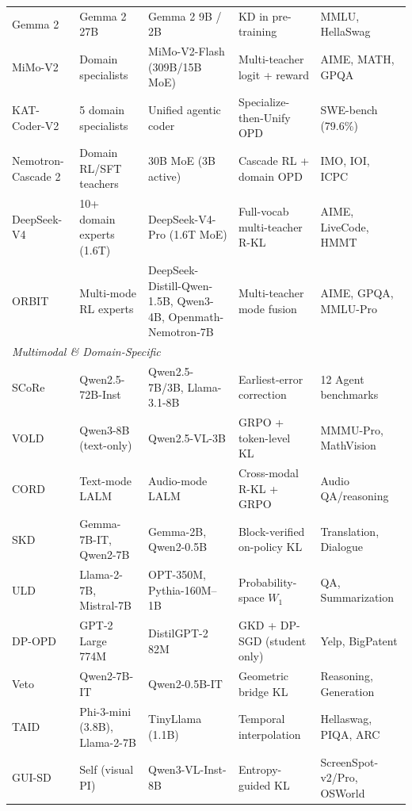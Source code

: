 \documentclass{article} %
\begin{document}
\begin{table}[t]
{\begin{tabular}{@{}lllll@{}}
        Gemma 2 \citep{2408.00118} & Gemma 2 27B & Gemma 2 9B / 2B & KD in pre-training & MMLU, HellaSwag \\
        MiMo-V2 \citep{2601.02780} & Domain specialists & MiMo-V2-Flash (309B/15B MoE) & Multi-teacher logit + reward & AIME, MATH, GPQA \\
        KAT-Coder-V2 \citep{li2026katcoderv2} & 5 domain specialists & Unified agentic coder & Specialize-then-Unify OPD & SWE-bench (79.6\%) \\
        Nemotron-Cascade 2 \citep{2603.19220} & Domain RL/SFT teachers & 30B MoE (3B active) & Cascade RL + domain OPD & IMO, IOI, ICPC \\
        DeepSeek-V4 \citep{deepseekv4} & 10+ domain experts (1.6T) & DeepSeek-V4-Pro (1.6T MoE) & Full-vocab multi-teacher R-KL & AIME, LiveCode, HMMT \\
        ORBIT \citep{liang2026orbit} & Multi-mode RL experts & DeepSeek-Distill-Qwen-1.5B, Qwen3-4B, Openmath-Nemotron-7B & Multi-teacher mode fusion & AIME, GPQA, MMLU-Pro \\
        \midrule
        \multicolumn{5}{l}{\textit{Multimodal \& Domain-Specific}} \\
        \midrule
        SCoRe \citep{2509.14257} & Qwen2.5-72B-Inst & Qwen2.5-7B/3B, Llama-3.1-8B & Earliest-error correction & 12 Agent benchmarks \\
        VOLD \citep{2510.23497} & Qwen3-8B (text-only) & Qwen2.5-VL-3B & GRPO + token-level KL & MMMU-Pro, MathVision \\
        CORD \citep{hu2026cord} & Text-mode LALM & Audio-mode LALM & Cross-modal R-KL + GRPO & Audio QA/reasoning \\
        SKD \citep{2410.11325} & Gemma-7B-IT, Qwen2-7B & Gemma-2B, Qwen2-0.5B & Block-verified on-policy KL & Translation, Dialogue \\
        ULD \citep{2402.12030} & Llama-2-7B, Mistral-7B & OPT-350M, Pythia-160M--1B & Probability-space $W_1$ & QA, Summarization \\
        DP-OPD \citep{khadem2026dpopd} & GPT-2 Large 774M & DistilGPT-2 82M & GKD + DP-SGD (student only) & Yelp, BigPatent \\
        Veto \citep{2601.07155} & Qwen2-7B-IT & Qwen2-0.5B-IT & Geometric bridge KL & Reasoning, Generation \\
        TAID \citep{2501.16937} & Phi-3-mini (3.8B), Llama-2-7B & TinyLlama (1.1B) & Temporal interpolation & Hellaswag, PIQA, ARC \\
        GUI-SD \citep{zhang2026guisd} & Self (visual PI) & Qwen3-VL-Inst-8B & Entropy-guided KL & ScreenSpot-v2/Pro, OSWorld \\

\end{tabular}}
\end{table}
\end{document}
